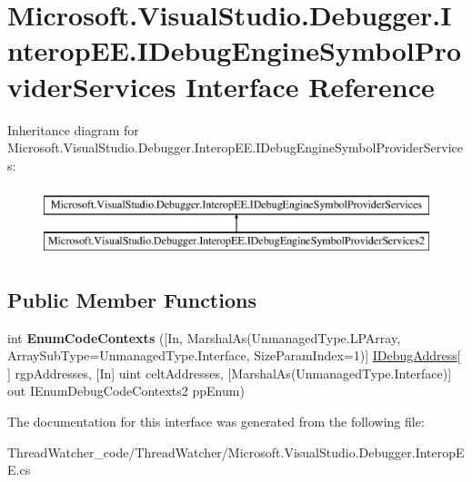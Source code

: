\hypertarget{interface_microsoft_1_1_visual_studio_1_1_debugger_1_1_interop_e_e_1_1_i_debug_engine_symbol_provider_services}{\section{Microsoft.\+Visual\+Studio.\+Debugger.\+Interop\+E\+E.\+I\+Debug\+Engine\+Symbol\+Provider\+Services Interface Reference}
\label{interface_microsoft_1_1_visual_studio_1_1_debugger_1_1_interop_e_e_1_1_i_debug_engine_symbol_provider_services}
}
Inheritance diagram for Microsoft.\+Visual\+Studio.\+Debugger.\+Interop\+E\+E.\+I\+Debug\+Engine\+Symbol\+Provider\+Services\+:\begin{figure}[H]
\begin{center}
\leavevmode
\includegraphics[height=2.000000cm]{interface_microsoft_1_1_visual_studio_1_1_debugger_1_1_interop_e_e_1_1_i_debug_engine_symbol_provider_services}
\end{center}
\end{figure}
\subsection*{Public Member Functions}
\begin{DoxyCompactItemize}
\item 
\hypertarget{interface_microsoft_1_1_visual_studio_1_1_debugger_1_1_interop_e_e_1_1_i_debug_engine_symbol_provider_services_a33e49976368621f846999213a422ebdc}{int {\bfseries Enum\+Code\+Contexts} (\mbox{[}In, Marshal\+As(Unmanaged\+Type.\+L\+P\+Array, Array\+Sub\+Type=Unmanaged\+Type.\+Interface, Size\+Param\+Index=1)\mbox{]} \hyperlink{interface_microsoft_1_1_visual_studio_1_1_debugger_1_1_interop_e_e_1_1_i_debug_address}{I\+Debug\+Address}\mbox{[}$\,$\mbox{]} rgp\+Addresses, \mbox{[}In\mbox{]} uint celt\+Addresses, \mbox{[}Marshal\+As(Unmanaged\+Type.\+Interface)\mbox{]} out I\+Enum\+Debug\+Code\+Contexts2 pp\+Enum)}\label{interface_microsoft_1_1_visual_studio_1_1_debugger_1_1_interop_e_e_1_1_i_debug_engine_symbol_provider_services_a33e49976368621f846999213a422ebdc}

\end{DoxyCompactItemize}


The documentation for this interface was generated from the following file\+:\begin{DoxyCompactItemize}
\item 
Thread\+Watcher\+\_\+code/\+Thread\+Watcher/Microsoft.\+Visual\+Studio.\+Debugger.\+Interop\+E\+E.\+cs\end{DoxyCompactItemize}
